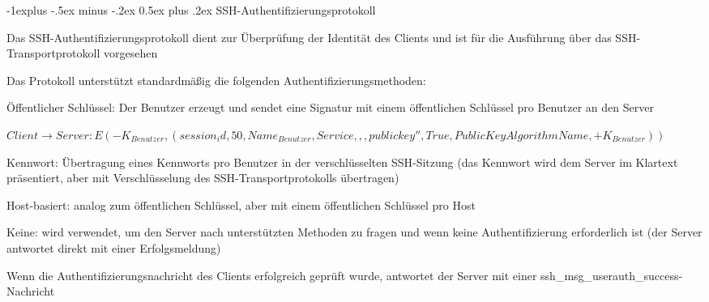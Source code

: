 \documentclass[a4paper]{article}
\makeatletter
\renewcommand{\subsection}{\@startsection{subsection}{2}{0mm}%
 {-1explus -.5ex minus -.2ex}%
 {0.5ex plus .2ex}%
 {\normalfont\normalsize\bfseries}}
\makeatother
\begin{document}
\begin{multicols}{3}
\begin{itemize*}
            \subsection{SSH-Authentifizierungsprotokoll}
            \begin{itemize*}
                  \item Das SSH-Authentifizierungsprotokoll dient zur Überprüfung der
                  Identität des Clients und ist für die Ausführung über das
                  SSH-Transportprotokoll vorgesehen
                  \item Das Protokoll unterstützt standardmäßig die folgenden
                  Authentifizierungsmethoden:
                  \begin{itemize*}
                        \item Öffentlicher Schlüssel: Der Benutzer erzeugt und sendet eine Signatur mit einem öffentlichen Schlüssel pro Benutzer an den Server
                        \item $Client\rightarrow Server: E(-K_{Benutzer}, (session_id, 50, Name_{Benutzer}, Service, ,,publickey'', True, PublicKeyAlgorithmName, +K_{Benutzer}))$
                        \item Kennwort: Übertragung eines Kennworts pro Benutzer in der verschlüsselten SSH-Sitzung (das Kennwort wird dem Server im Klartext präsentiert, aber mit Verschlüsselung des SSH-Transportprotokolls übertragen)
                        \item Host-basiert: analog zum öffentlichen Schlüssel, aber mit einem öffentlichen Schlüssel pro Host
                        \item Keine: wird verwendet, um den Server nach unterstützten Methoden zu fragen und wenn keine Authentifizierung erforderlich ist (der Server antwortet direkt mit einer Erfolgsmeldung)
                  \end{itemize*}
                  \item Wenn die Authentifizierungsnachricht des Clients erfolgreich geprüft
                  wurde, antwortet der Server mit einer
                  ssh\_msg\_userauth\_success-Nachricht
            \end{itemize*}


\end{itemize*}
\end{multicols}
\end{document}
